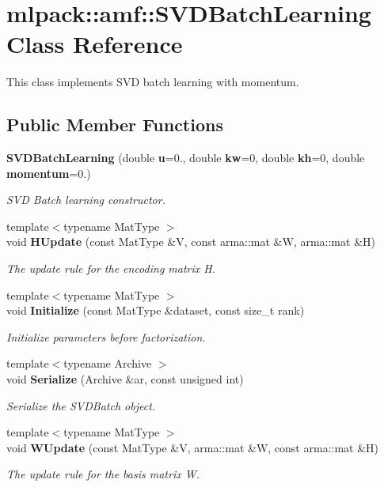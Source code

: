 \section{mlpack\+:\+:amf\+:\+:S\+V\+D\+Batch\+Learning Class Reference}
\label{classmlpack_1_1amf_1_1SVDBatchLearning}


This class implements S\+VD batch learning with momentum.  


\subsection*{Public Member Functions}
\begin{DoxyCompactItemize}
\item 
{\bf S\+V\+D\+Batch\+Learning} (double {\bf u}=0., double {\bf kw}=0, double {\bf kh}=0, double {\bf momentum}=0.)
\begin{DoxyCompactList}\small\item\em S\+VD Batch learning constructor. \end{DoxyCompactList}\item 
{\footnotesize template$<$typename Mat\+Type $>$ }\\void {\bf H\+Update} (const Mat\+Type \&V, const arma\+::mat \&W, arma\+::mat \&H)
\begin{DoxyCompactList}\small\item\em The update rule for the encoding matrix H. \end{DoxyCompactList}\item 
{\footnotesize template$<$typename Mat\+Type $>$ }\\void {\bf Initialize} (const Mat\+Type \&dataset, const size\+\_\+t rank)
\begin{DoxyCompactList}\small\item\em Initialize parameters before factorization. \end{DoxyCompactList}\item 
{\footnotesize template$<$typename Archive $>$ }\\void {\bf Serialize} (Archive \&ar, const unsigned int)
\begin{DoxyCompactList}\small\item\em Serialize the S\+V\+D\+Batch object. \end{DoxyCompactList}\item 
{\footnotesize template$<$typename Mat\+Type $>$ }\\void {\bf W\+Update} (const Mat\+Type \&V, arma\+::mat \&W, const arma\+::mat \&H)
\begin{DoxyCompactList}\small\item\em The update rule for the basis matrix W. \end{DoxyCompactList}\end{DoxyCompactItemize}
